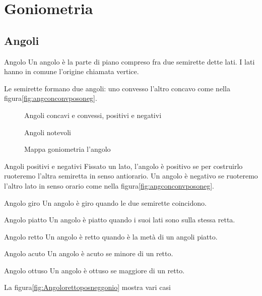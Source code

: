\chapter{Goniometria}
\label{sec:GONIOMETRIA}
\section{Angoli}
\label{sec:gonioang}
\begin{definizionet}{Angolo}{}
Un angolo è la parte di piano compreso fra due semirette dette lati. I lati hanno in comune l'origine chiamata vertice.
\end{definizionet}

Le  semirette formano due angoli:  uno convesso l'altro concavo come nella figura\nobs\vref{fig:angconconvposoneg}. 
\begin{figure} %
	\centering

	\caption{Angoli concavi e convessi, positivi e negativi}\label{fig:angconconvposoneg}
\end{figure}
\begin{figure} %
	\centering

	\caption{Angoli notevoli}\label{fig:Angolorettoposneggonio}
\end{figure}
\begin{figure}

%
	\caption{Mappa goniometria l'angolo}\label{fig:MappaGonometria1}
\end{figure}
\begin{definizionet}{Angoli positivi e negativi}{}
	Fissato un lato, l'angolo è  positivo  se per costruirlo ruoteremo l'altra semiretta in senso antiorario.  Un angolo è negativo se ruoteremo l'altro lato in senso orario come nella figura\nobs\vref{fig:angconconvposoneg}. 
\end{definizionet}
\begin{definizionet}{Angolo giro}{}
Un angolo è giro quando le due semirette coincidono. 
\end{definizionet}
\begin{definizionet}{Angolo piatto}{}
Un angolo è  piatto quando i suoi lati sono sulla stessa retta.
\end{definizionet}
\begin{definizionet}{Angolo retto}{}
Un angolo è retto quando è la metà di un angoli piatto. 
\end{definizionet}
\begin{definizionet}{Angolo acuto}{}
Un angolo è acuto se  minore di un  retto.
\end{definizionet}
\begin{definizionet}{Angolo ottuso}{}
Un angolo è ottuso se  maggiore di un  retto.
\end{definizionet}
 La figura\nobs\vref{fig:Angolorettoposneggonio} mostra  vari casi
